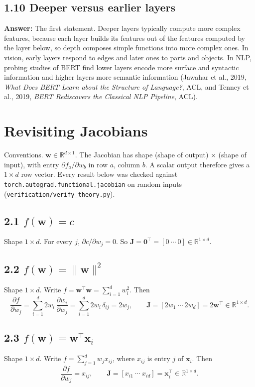 \documentclass[11pt]{article}
\newcommand{\R}{\mathbb{R}}
\begin{document}
\subsection*{1.10 Deeper versus earlier layers}
\textbf{Answer:} The first statement. Deeper layers typically compute more complex features, because each layer builds its features out of the features computed by the layer below, so depth composes simple functions into more complex ones. In vision, early layers respond to edges and later ones to parts and objects. In NLP, probing studies of BERT find lower layers encode more surface and syntactic information and higher layers more semantic information (Jawahar et al., 2019, \emph{What Does BERT Learn about the Structure of Language?}, ACL, and Tenney et al., 2019, \emph{BERT Rediscovers the Classical NLP Pipeline}, ACL).

\section{Revisiting Jacobians}
Conventions. $\mathbf{w}\in\R^{d\times 1}$. The Jacobian has shape (shape of output) $\times$ (shape of input), with entry $\partial f_a/\partial w_b$ in row $a$, column $b$. A scalar output therefore gives a $1\times d$ row vector. Every result below was checked against \texttt{torch.autograd.functional.jacobian} on random inputs (\texttt{verification/verify\_theory.py}).

\subsection*{2.1 $f(\mathbf{w}) = c$}
Shape $1\times d$. For every $j$, $\partial c/\partial w_j = 0$. So $\mathbf{J} = \mathbf{0}^\top = [0\ \cdots\ 0] \in \R^{1\times d}$.

\subsection*{2.2 $f(\mathbf{w}) = \|\mathbf{w}\|^2$}
Shape $1\times d$. Write $f = \mathbf{w}^\top\mathbf{w} = \sum_{i=1}^d w_i^2$. Then
\[
\frac{\partial f}{\partial w_j} = \sum_{i=1}^d 2w_i\,\frac{\partial w_i}{\partial w_j} = \sum_{i=1}^d 2w_i\,\delta_{ij} = 2w_j,
\qquad
\mathbf{J} = [2w_1\ \cdots\ 2w_d] = 2\mathbf{w}^\top \in\R^{1\times d}.
\]

\subsection*{2.3 $f(\mathbf{w}) = \mathbf{w}^\top\mathbf{x}_i$}
Shape $1\times d$. Write $f = \sum_{j=1}^d w_j x_{ij}$, where $x_{ij}$ is entry $j$ of $\mathbf{x}_i$. Then
\[
\frac{\partial f}{\partial w_j} = x_{ij}, \qquad \mathbf{J} = [x_{i1}\ \cdots\ x_{id}] = \mathbf{x}_i^\top\in\R^{1\times d}.
\]
\end{document}
